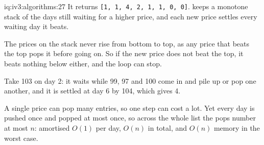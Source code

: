 \begin{solution}{iq:iv3:algorithms:27}
It returns \texttt{[1, 1, 4, 2, 1, 1, 0, 0]}.  keeps a monotone stack of the days still waiting for a higher price, and each new price settles every waiting day it beats.
\label{lst:iv3:al:nextgreater}

The prices on the stack never rise from bottom to top, as any price that beats the top pops it before going on. So if the new price does not beat the top, it beats nothing below either, and the loop can stop.

Take 103 on day 2: it waits while 99, 97 and 100 come in and pile up or pop one another, and it is settled at day 6 by 104, which gives 4.

A single price can pop many entries, so one step can cost a lot. Yet every day is pushed once and popped at most once, so across the whole list the pops number at most $n$: amortised $O(1)$ per day, $O(n)$ in total, and $O(n)$ memory in the worst case.

\end{solution}

